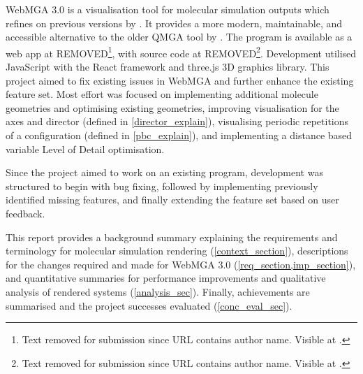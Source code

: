 WebMGA 3.0 is a visualisation tool for molecular simulation outputs which refines on previous versions by \textcite{Battistini_2021,webmga_2}. It provides a more modern, maintainable, and accessible alternative to the older QMGA tool by \textcite{gabriel2008molecular}. The program is available as a web app at REMOVED\footnote{Text removed for submission since URL contains author name. Visible at \cite{webmga_3_app}.}, with source code at REMOVED\footnote{Text removed for submission since URL contains author name. Visible at \cite{webmga_3_github}.}. Development utilised JavaScript with the React\cite{react} framework and three.js\cite{three} 3D graphics library. This project aimed to fix existing issues in WebMGA and further enhance the existing feature set. Most effort was focused on implementing additional molecule geometries and optimising existing geometries, improving visualisation for the axes and director (defined in \cref{director_explain}), visualising periodic repetitions of a configuration (defined in \cref{pbc_explain}), and implementing a distance based variable Level of Detail optimisation.

Since the project aimed to work on an existing program, development was structured to begin with bug fixing, followed by implementing previously identified missing features, and finally extending the feature set based on user feedback.

This report provides a background summary explaining the requirements and terminology for molecular simulation rendering (\cref{context_section}), descriptions for the changes required and made for WebMGA 3.0 (\cref{req_section,imp_section}), and quantitative summaries for performance improvements and qualitative analysis of rendered systems (\cref{analysis_sec}). Finally, achievements are summarised and the project successes evaluated (\cref{conc_eval_sec}).

